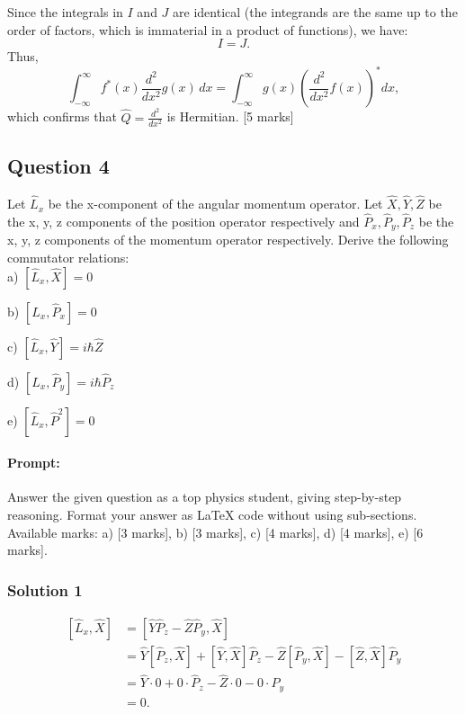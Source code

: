 \documentclass{article}
\begin{document}
Since the integrals in \(I\) and \(J\) are identical (the integrands are the same up to the order of factors, which is immaterial in a product of functions), we have:
\[
I = J.
\]
Thus, 
\[
\int_{-\infty}^{\infty} f^*(x) \frac{d^2}{dx^2}g(x)\, dx = \int_{-\infty}^{\infty} g(x) \left(\frac{d^2}{dx^2}f(x)\right)^* dx,
\]
which confirms that \(\hat{Q} = \frac{d^2}{dx^2}\) is Hermitian. \hfill [5 marks]

\subsection{Question 4}

Let $\hat{L}_x$ be the x-component of the angular momentum operator. Let $\hat{X}, \hat{Y}, \hat{Z}$ be the x, y, z components of the position operator respectively and $\hat{P}_x, \hat{P}_y, \hat{P}_z$ be the x, y, z components of the momentum operator respectively. Derive the following commutator relations:   \\

a) $\left[\hat{L}_x, \hat{X}\right] = 0$  

b) $\left[\hat{L}_x, \hat{P}_x\right] = 0$  

c) $\left[\hat{L}_x, \hat{Y}\right] = i\hbar \hat{Z}$  

d) $\left[\hat{L}_x, \hat{P}_y\right] = i\hbar \hat{P}_z$  

e) $\left[\hat{L}_x, \hat{P}^2\right] = 0$

\paragraph{Prompt: \\} 
Answer the given question as a top physics student, giving step-by-step reasoning. Format your answer as LaTeX code without using sub-sections. Available marks: a) [3 marks], b) [3 marks], c) [4 marks], d) [4 marks], e) [6 marks].

\subsubsection{Solution 1}

\[
\begin{aligned}
[\hat{L}_x, \hat{X}] &= [\hat{Y}\hat{P}_z - \hat{Z}\hat{P}_y,\hat{X}]\\[1mm]
&= \hat{Y}[\hat{P}_z,\hat{X}] + [\hat{Y},\hat{X}]\hat{P}_z - \hat{Z}[\hat{P}_y,\hat{X}] - [\hat{Z},\hat{X}]\hat{P}_y\\[1mm]
&= \hat{Y}\cdot 0 + 0\cdot\hat{P}_z - \hat{Z}\cdot 0 - 0\cdot\hat{P}_y\\[1mm]
&= 0.
\end{aligned}
\]
\end{document}
